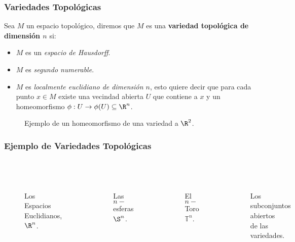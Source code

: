 \begin{frame}
\frametitle{Variedades Topológicas}
\begin{definition}
  Sea $M$ un espacio topológico, diremos que $M$ es una \textbf{variedad topológica de dimensión $n$} si:
  \begin{itemize}
    \item $M$ es un \textit{espacio de Hausdorff}.
    \item $M$ es \textit{segundo numerable}.
    \item $M$ es \textit{localmente euclidiano de dimensión $n$}, esto quiere decir que para cada punto $x \in M$ existe una vecindad abierta $U$ que contiene a $x$ y un homeomorfismo $\phi: U \to \phi(U)\subseteq \R^n$.
  \end{itemize}
\end{definition}\pause
\end{frame}

\begin{frame}
\centering
\begin{figure}
  
  \caption{Ejemplo de un homeomorfismo de una variedad a $\R^{2}$.}
\end{figure}
\end{frame}

\begin{frame}
\frametitle{Ejemplo de Variedades Topológicas}
\begin{columns}[t]
\centering
  \begin{figure}
    \scalebox{.5}{}\\
    \caption{Los Espacios Euclidianos, $\R^n$.}
  \end{figure}
  \begin{figure}
    \scalebox{.5}{}\\
  \caption{Las $n-$esferas $\S^n$.}
  \end{figure}
\centering
  \begin{figure}
    \scalebox{.5}{}\\
    \caption{El $n-$Toro $\mathbb{T}^n$.}
  \end{figure}
  \begin{figure}
    \centering
    \scalebox{.5}{}\\
    \caption{Los subconjuntos abiertos\\ de las variedades.}
  \end{figure}
\end{columns}
\end{frame}

